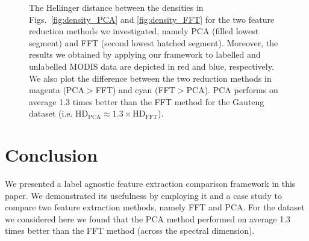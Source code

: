 \documentclass{article}
\begin{document}
% 
% 
% 

\begin{figure}[h]
\begin{minipage}[b]{0.9\linewidth}
   \centering
   \centerline{}
 \end{minipage}
 \caption{The Hellinger distance between the densities in Figs.~\ref{fig:density_PCA} and \ref{fig:density_FFT} for the two feature reduction methods we investigated, namely PCA (filled lowest segment) and FFT (second lowest hatched segment).
 Moreover, the results we obtained by applying our framework to labelled and unlabelled MODIS data are depicted in red and blue, respectively.  
 We also plot the difference between the two reduction methods in magenta (PCA$>$FFT) and cyan (FFT$>$PCA). 
 PCA performs on average 1.3 times better than the FFT method for the Gauteng dataset (i.e. $\textrm{HD}_{\textrm{PCA}} \approx 1.3\times \textrm{HD}_{\textrm{FFT}}$).}
\label{fig:HD}
\end{figure}

\section{Conclusion}
\label{sec:ref}
We presented a label agnostic feature extraction comparison framework in this paper. We demonstrated its usefulness by employing it and a case study to compare two feature extraction methods,
namely FFT and PCA. For the dataset we considered here we found that the PCA method performed on average 1.3 times better than the FFT method (across the spectral dimension).




\end{document}
